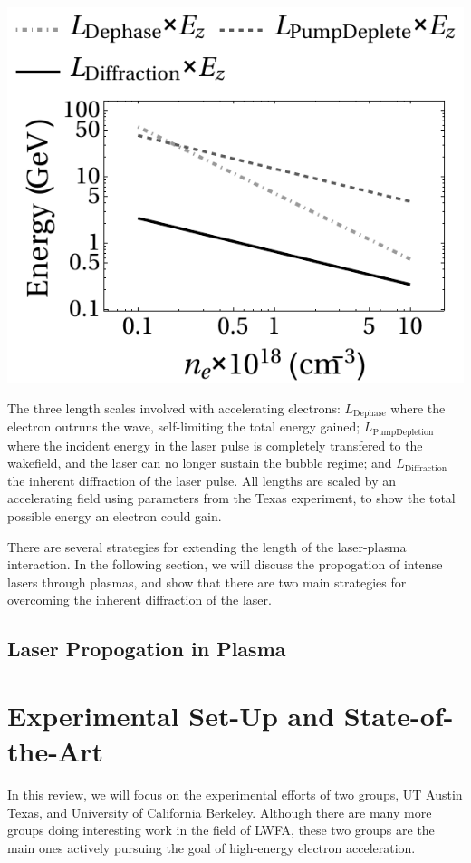 \documentclass[12pt,letter]{article}
\begin{document}
    \begin{marginfigure}
            \includegraphics[width=\linewidth]{../figures/energy.pdf}
        \caption{The three length scales involved with accelerating electrons:
        $L_\mathrm{Dephase}$ where the electron outruns the wave, self-limiting
    the total energy gained; $L_\mathrm{Pump Depletion}$ where the incident
energy in the laser pulse is completely transfered to the wakefield, and the
laser can no longer sustain the bubble regime; and $L_\mathrm{Diffraction}$ the
inherent diffraction of the laser pulse. All lengths are scaled by an
accelerating field using parameters from the Texas
experiment\cite{Wang2013}, to show the total possible energy an electron
could gain.\label{fig:energy}}
    \end{marginfigure}

    There are several strategies for extending the length of the laser-plasma
    interaction. In the following section, we will discuss the propogation of
    intense lasers through plasmas, and show that there are two main strategies
    for overcoming the inherent diffraction of the laser.

    \subsection{Laser Propogation in Plasma}
    
\section{Experimental Set-Up and State-of-the-Art}
In this review, we will focus on the experimental efforts of two groups, UT
Austin Texas, and University of California Berkeley. Although there are many
more groups doing interesting work in the field of LWFA, these two groups are
the main ones actively pursuing the goal of high-energy electron
acceleration.
\end{document}
